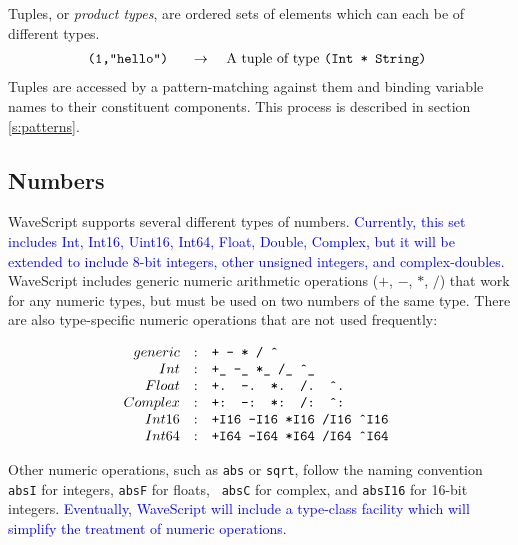 \documentclass[twocolumn]{report}
\newcommand{\rednote}[1]{{\textcolor{blue}{#1}}}
\newcommand{\evalsto}[2]{\[ \begin{array}{rcl}
$\tt #1 $&$ \arr $&$ #2 $
\end{array} \]}
\newcommand{\arr}{\ensuremath{\rightarrow}}
\newcommand{\ws}{WaveScript}
\newenvironment{wscode}{\begin{center}\tt}{\end{center}}
\begin{document}
Tuples, or {\em product types}, are ordered sets of elements which can
each be of different types. 
\evalsto{(1,``hello'')}{A tuple of type {\tt (Int * String)}}
Tuples are accessed by a pattern-matching against them and binding
variable names to their constituent components.  This process is
described in section \ref{s:patterns}.

\subsection{Numbers}

WaveScript supports several different types of numbers.  \rednote{Currently,
this set includes Int, Int16, Uint16, Int64, Float, Double, Complex, but it will be extended
to include 8-bit integers, other unsigned integers, and complex-doubles.}
WaveScript includes generic numeric arithmetic operations ($+$, $-$,
$*$, $/$) that work for any numeric types, but must be used on two
numbers of the same type.  There are also type-specific numeric
operations that are not used frequently:

\[
\begin{array}{rcl}
generic          & : & $\tt + - * / \^{}$   \\
Int              & : & $\tt +\_ -\_ *\_ /\_ \^{}\_ $ \\
Float            & : & $\tt +. -. *. /. \^{}. $ \\
Complex          & : & $\tt +: -: *: /: \^{}: $ \\
Int16            & : & $\tt +I16 -I16 *I16 /I16 \^{}I16 $   \\
Int64            & : & $\tt +I64 -I64 *I64 /I64 \^{}I64 $   \\
\end{array}
\]

Other numeric operations, such as {\tt abs} or {\tt sqrt}, follow the
naming convention {\tt absI} for integers, {\tt absF} for floats, {\tt
absC} for complex, and {\tt absI16} for 16-bit integers.
\rednote{Eventually, {\ws} will include a type-class facility which
  will simplify the treatment of numeric operations.}


\end{document}

